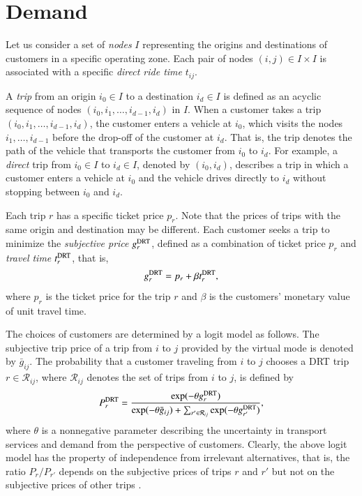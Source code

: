 \documentclass[dissertation,draft*]{aaltoseries}
\begin{document}

\section{Demand}
\label{demand}
Let us consider a set of \emph{nodes} $I$ representing the origins and destinations of customers in a specific operating zone.
Each pair of nodes $(i,j) \in I \times I$ is associated with a specific \emph{direct ride time} $t_{ij}$.

A \emph{trip} from an origin $i_0 \in I$ to a destination $i_d \in I$ is defined as an acyclic sequence of nodes 
$(i_0,i_1,\ldots,i_{d-1},i_d)$ in $I$.
When a customer takes a trip $(i_0,i_1,\ldots,i_{d-1},i_d)$, the customer enters a vehicle at $i_0$, which
visits the nodes $i_1,\ldots,i_{d-1}$ before the drop-off of the customer at $i_d$. That is, the
trip denotes the path of the vehicle that transports the customer from $i_0$ to $i_d$.
For example, a \emph{direct} trip from $i_0 \in I$ to $i_d \in I$, denoted by $(i_0,i_d)$, describes a trip in which a customer enters 
a vehicle at $i_0$ and the vehicle drives directly to $i_d$ without stopping between $i_0$ and $i_d$. 

Each trip $r$ has a specific ticket price $p_r$. 
Note that the prices of trips with the same origin and destination may be different.
Each customer seeks a trip to minimize the \emph{subjective price} $g_r^{\rm DRT}$, 
defined as a combination of ticket price $p_r$ and \emph{travel time} $t_{r}^{\rm DRT}$, that is,
\begin{align}
\label{asiakashinta}
g_{r}^{\rm DRT} = p_{r} + \beta t_{r}^{\rm DRT},
\end{align}
where $p_{r}$ is the ticket price for the trip $r$ and $\beta$ is the customers' 
monetary value of unit travel time.

The choices of customers are determined by a logit model as follows.
The subjective trip price of a trip from $i$ to $j$ provided by the virtual mode is denoted by $\bar{g}_{ij}$.
The probability that a customer traveling from $i$ to $j$ chooses a DRT trip $r \in \mathcal{R}_{ij}$, where $\mathcal{R}_{ij}$ denotes the 
set of trips from $i$ to $j$, is defined by
\begin{align}
\label{kysyntatn}
P_{r}^{\rm DRT} = 
\frac{\exp(-\theta g_{r}^{\rm DRT})}{\exp(-\theta \bar{g}_{ij}) + \sum_{r' \in \mathcal{R}_{ij}}\exp(-\theta g_{r'}^{\rm DRT})},
\end{align}
where $\theta$ is a nonnegative parameter describing the uncertainty in transport services and demand
from the perspective of customers.  
Clearly, the above logit model has the property of independence from irrelevant alternatives, that is, 
the ratio $P_{r}/P_{r'}$ depends on the subjective prices of trips $r$ and $r'$ but
not on the subjective prices of other trips \citep{small2007}.
\end{document}
